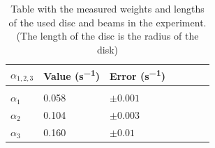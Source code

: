 \begin{table}[ht]
	\begin{tabularx}{\textwidth}{XM{1.8cm}M{2cm}M{2cm}M{2cm}M{2cm}M{2cm}}%
		\toprule 
		\textbf{$\alpha_{1, 2, 3}$}& \textbf{Value} (\si{\second^{-1}})  & \textbf{Error} \qquad (\si{\second^{-1}}) \\
		\hline
		&&&&&&\\[-5pt]
		$\alpha_1$	& 0.058	& $\pm 0.001$	\\[5pt]
		
		$\alpha_2$	& 0.104 & $\pm 0.003$	\\[5pt]
		
		$\alpha_3$	& 0.160 & $\pm 0.01$	\\[5pt]
		
		\bottomrule 
	\end{tabularx}
	\caption{Table with the measured weights and lengths of the used disc and beams in the experiment. (The length of the disc is the radius of the disk)}
	\label{tab::measure}
\end{table}



